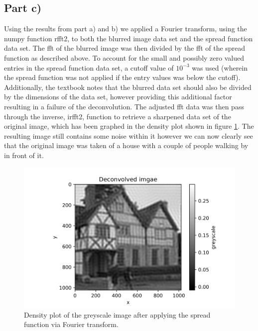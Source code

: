 \documentclass{article}
\begin{document}
\subsection{Part c)}
Using the results from part a) and b) we applied a Fourier transform, using the numpy function rfft2, to both the blurred image data set and the spread function data set.
The fft of the blurred image was then divided by the fft of the spread function as described above. To account for the small and possibly zero valued entries in the spread function data set, a cutoff value of $10^{-3}$ was used (wherein the spread function was not applied if the entry values was below the cutoff). Additionally, the textbook notes that the blurred data set should also be divided by the dimensions of the data set, however providing this additional factor resulting in a failure of the deconvolution.
The adjusted fft data was then pass through the inverse, irfft2, function to retrieve a sharpened data set of the original image, which has been graphed in the density plot shown in figure \ref{fig:deconvolved_image}. The resulting image still contains some noise within it however we can now clearly see that the original image was taken of a house with a couple of people walking by in front of it. 

\begin{figure}[H]
	\centering
	\includegraphics{../images/deconvolved_image.png}
	\caption{Density plot of the greyscale image after applying the spread function via Fourier transform.}
	\label{fig:deconvolved_image}	
\end{figure}
\end{document}

